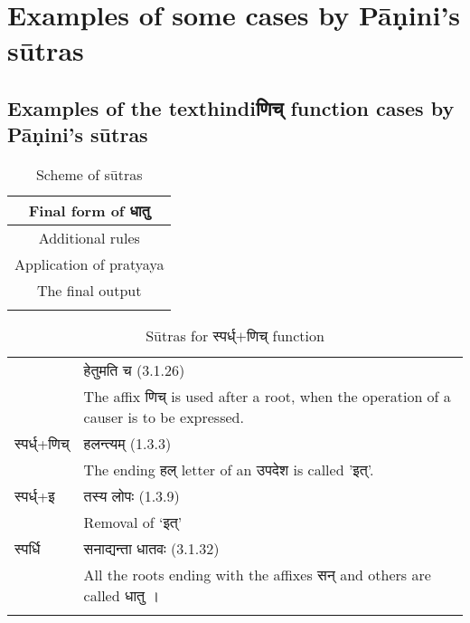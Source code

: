 \chapter{Examples of some cases by Pāṇini’s sūtras}

\section{Examples of the texthindi{णिच्} function cases by Pāṇini’s sūtras}

		\begin{longtable}{ |c| } 
			\hline
			\rowcolor{red!10}
			Final form of \texthindi{धातु} \\
			\hline
			\rowcolor{green!10}
			Additional rules \\
			\hline
			\rowcolor{blue!10}
			Application of pratyaya\\
			\hline
			\rowcolor{yellow!10}
			The final output\\
			\hline
		\caption{Scheme of sūtras}
		\label{table:a1}
		\end{longtable}



		\begin{longtable}{ |p{1.6cm}|p{14.4cm}| } 
			\hline
			\rowcolor{red!10}
			&\texthindi{हेतुमति च (3.1.26)}\\
			\rowcolor{red!10} \multirow{-1.5}{*}{ \texthindi{स्पर्ध्}}
			&The affix \texthindi{णिच्} is used after a root, when the operation of a causer is to be expressed.\\
			\hline
			\rowcolor{blue!10}
			\texthindi{स्पर्ध्+णिच् }&
			\texthindi{हलन्त्यम् }(1.3.3)\\
			\rowcolor{blue!10}
			&The ending \texthindi{हल्} letter of an \texthindi{उपदेश} is called '\texthindi{इत्}'.
			\\
			\hline
			\rowcolor{blue!10}
			\texthindi{स्पर्ध्+इ }&
			\texthindi{तस्य लोपः }(1.3.9)\\
			\rowcolor{blue!10}
			&Removal of ‘\texthindi{इत्}’
			\\
			\hline
			\rowcolor{yellow!10}
			\texthindi{स्पर्धि}&
			\texthindi{सनाद्यन्ता धातवः }(3.1.32)\\
			\rowcolor{yellow!10}
			&All the roots ending with the affixes \texthindi{सन्} and others are called \texthindi{धातु} ।
			\\
			\hline
		\caption{Sūtras for \texthindi{स्पर्ध्$+$णिच्} function}
		\label{table:a2}
		\end{longtable}

